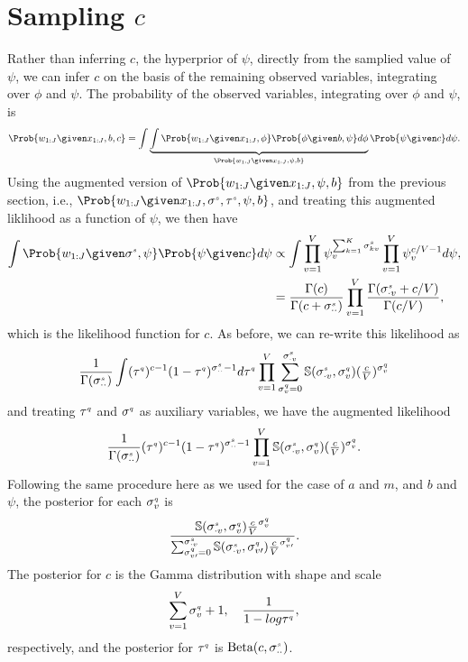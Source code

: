 \section{Sampling $\mathit{c}$}

Rather than inferring $c$, the hyperprior of $\psi$, directly from the
samplied value of $\psi$, we can infer $c$ on the basis of the remaining observed variables,
integrating over $\phi$ and $\psi$. The probability of the observed variables,
integrating over $\phi$ and $\psi$, is
\[
	\Prob{w_{1:J} \given x_{1:J}, b, c}
	=
	\int	
	\underbrace{\int \Prob{w_{1:J}\given x_{1:J}, \phi}\Prob{\phi\given b, \psi} d\phi}_{\Prob{w_{1:J}\given x_{1:J},\psi,b}}
	\Prob{\psi \given c}  d\psi.
\]
Using the augmented version of $\Prob{w_{1:J}\given x_{1:J},\psi,b}$ from the
previous section, i.e., $\Prob{w_{1:J}\given
x_{1:J},\stirS{s},\stirT{s},\psi,b}$, and treating this augmented liklihood as a function of
$\psi$, we then have
\begin{align*}
	\int
	\Prob{w_{1:J}\given \stirS{s},\psi}\Prob{\psi \given c}
	d\psi
	&\propto
	\int
	\prod_{v=1}^V \psi_{v}^{\sum_{k=1}^K \stirs{s}{kv}} 
	\prod_{v=1}^V \psi_{v}^{c/V -1}
	d\psi,\\
	&=
	\frac{\Gamma(c)}{\Gamma(c+\stirs{s}{\cdot\cdot})}\prod_{v=1}^V\frac{\Gamma(\stirs{s}{\cdot v} + c/V)}{\Gamma(c/V)},
\end{align*}
which is the likelihood function for $c$. As before, we can re-write this likelihood as 
\[
	\frac{1}{\Gamma(\sigma^{\text{\tiny{$s$}}}_{\cdot\cdot})} \int (\tau^{\text{\tiny{$q$}}}_{})^{c-1} (1-\tau^{\text{\tiny{$q$}}}_{})^{\sigma^{\text{\tiny{$s$}}}_{\cdot\cdot}-1} d\tau^{\text{\tiny{$q$}}}_{}
	\prod_{v=1}^V
	\sum_{\sigma^{\text{\tiny{$q$}}}_{v}=0}^{\sigma^{\text{\tiny{$s$}}}_{\cdot v}}
	\mathbb{S}(\sigma^{\text{\tiny{$s$}}}_{\cdot v},\sigma^{\text{\tiny{$q$}}}_{v})(\tfrac{c}{V})^{\sigma^{\text{\tiny{$q$}}}_{v}}
\]
and treating $\tau^{\text{\tiny{$q$}}}$ and $\sigma^{\text{\tiny{$q$}}}$ as auxiliary variables, we have the augmented likelihood
\[
	\frac{1}{\Gamma(\sigma^{\text{\tiny{$s$}}}_{\cdot\cdot})} (\tau^{\text{\tiny{$q$}}}_{})^{c-1} (1-\tau^{\text{\tiny{$q$}}}_{})^{\sigma^{\text{\tiny{$s$}}}_{\cdot\cdot}-1}
	\prod_{v=1}^V
	\mathbb{S}(\sigma^{\text{\tiny{$s$}}}_{\cdot v},\sigma^{\text{\tiny{$q$}}}_{v})(\tfrac{c}{V})^{\sigma^{\text{\tiny{$q$}}}_{v}}.
\]
Following the same procedure here as we used for the case of $a$ and $m$, and $b$ and $\psi$, the posterior for each $\sigma^{\text{\tiny{$q$}}}_{v}$ is
\[
\frac{ \mathbb{S}(\sigma^{\text{\tiny{$s$}}}_{\cdot v},\sigma^{\text{\tiny{$q$}}}_{v})\frac{c}{V}^{\sigma^{\text{\tiny{$q$}}}_{v}} } { \sum_{\sigma^{\text{\tiny{$q$}}}_{v\prime}=0}^{\sigma^{\text{\tiny{$s$}}}_{\cdot v}}\mathbb{S}(\sigma^{\text{\tiny{$s$}}}_{\cdot v},\sigma^{\text{\tiny{$q$}}}_{v\prime})\frac{c}{V}^{\sigma^{\text{\tiny{$q$}}}_{v\prime}} } .
\]
The posterior for $c$ is the Gamma distribution with shape and scale 
\[
\sum_{v=1}^V\sigma^{\text{\tiny{$q$}}}_{v} + 1,\quad \frac{1}{1 - log\tau^{\text{\tiny{$q$}}}_{}},
\]
respectively, and the posterior for $\tau^{\text{\tiny{$q$}}}_{}$ is $\textrm{Beta}(c,\sigma^{\text{\tiny{$s$}}}_{\cdot\cdot})$.
